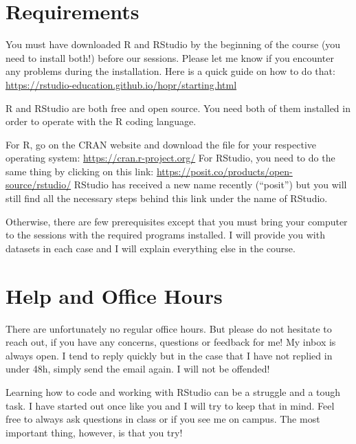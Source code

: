 \documentclass[
  letterpaper,
  DIV=11,
  numbers=noendperiod]{scrreprt}
\begin{document}
\hypertarget{requirements}{%
\section*{Requirements}\label{requirements}}


You must have downloaded R and RStudio by the beginning of the course
(you need to install both!) before our sessions. Please let me know if
you encounter any problems during the installation. Here is a quick
guide on how to do that:
\url{https://rstudio-education.github.io/hopr/starting.html}

R and RStudio are both free and open source. You need both of them
installed in order to operate with the R coding language.

For R, go on the CRAN website and download the file for your respective
operating system: \url{https://cran.r-project.org/} For RStudio, you
need to do the same thing by clicking on this link:
\url{https://posit.co/products/open-source/rstudio/} RStudio has
received a new name recently (``posit'') but you will still find all the
necessary steps behind this link under the name of RStudio.

Otherwise, there are few prerequisites except that you must bring your
computer to the sessions with the required programs installed. I will
provide you with datasets in each case and I will explain everything
else in the course.

\hypertarget{help-and-office-hours}{%
\section*{Help and Office Hours}\label{help-and-office-hours}}


There are unfortunately no regular office hours. But please do not
hesitate to reach out, if you have any concerns, questions or feedback
for me! My inbox is always open. I tend to reply quickly but in the case
that I have not replied in under 48h, simply send the email again. I
will not be offended!

Learning how to code and working with RStudio can be a struggle and a
tough task. I have started out once like you and I will try to keep that
in mind. Feel free to always ask questions in class or if you see me on
campus. The most important thing, however, is that you try!
\end{document}

